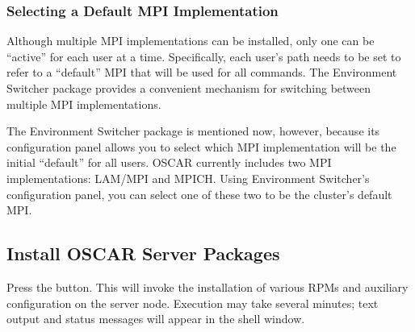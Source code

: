 
\subsubsection{Selecting a Default MPI Implementation}
\label{det:configure-packages-switcher}

Although multiple MPI implementations can be installed, only one can
be ``active'' for each user at a time.  Specifically, each user's path
needs to be set to refer to a ``default'' MPI that will be used for
all commands.  The Environment Switcher package provides a convenient
mechanism for switching between multiple MPI implementations.

The Environment Switcher package is mentioned now, however, because
its configuration panel allows you to select which MPI implementation
will be the initial ``default'' for all users.  OSCAR currently
includes two MPI implementations: LAM/MPI and MPICH.  Using
Environment Switcher's configuration panel, you can select one of
these two to be the cluster's default MPI.  



\subsection{Install OSCAR Server Packages}
\label{det:install-server-packages}

Press the  button.  This will
invoke the installation of various RPMs and auxiliary configuration on
the server node.  Execution may take several minutes; text output
and status messages will appear in the shell window.

